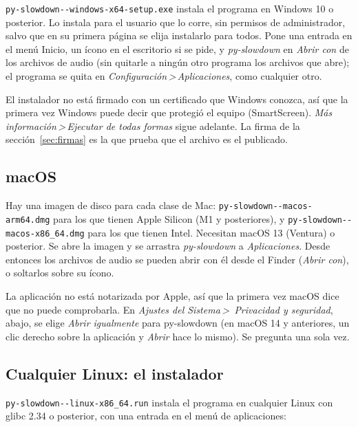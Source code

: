 \documentclass[12pt,
              article,
              oneside
              ]{memoir}
\newcommand*{\menu}[1]{\textit{#1}}
\newcommand*{\then}{\,>\,}
\begin{document}
%
\texttt{py-slowdown-\version-windows-x64-setup.exe} instala el programa en
Windows 10 o posterior. Lo instala para el usuario que lo corre, sin
permisos de administrador, salvo que en su primera página se elija
instalarlo para todos. Pone una entrada en el menú Inicio, un ícono en el
escritorio si se pide, y \menu{py-slowdown} en \menu{Abrir con} de los
archivos de audio (sin quitarle a ningún otro programa los archivos que
abre); el programa se quita en \menu{Configuración\then Aplicaciones}, como
cualquier otro.

%
El instalador no está firmado con un certificado que Windows conozca, así
que la primera vez Windows puede decir que protegió el equipo
(SmartScreen). \menu{Más información\then Ejecutar de todas formas} sigue
adelante. La firma de la sección~\ref{sec:firmas} es la que prueba que el
archivo es el publicado.

\subsection{macOS}

%
Hay una imagen de disco para cada clase de Mac:
\texttt{py-slowdown-\version-macos-arm64.dmg} para los que tienen Apple
Silicon (M1 y posteriores), y \texttt{py-slowdown-\version-macos-x86\_64.dmg}
para los que tienen Intel. Necesitan macOS 13 (Ventura) o posterior. Se
abre la imagen y se arrastra \menu{py-slowdown} a \menu{Aplicaciones}.
Desde entonces los archivos de audio se pueden abrir con él desde el Finder
(\menu{Abrir con}), o soltarlos sobre su ícono.

%
La aplicación no está notarizada por Apple, así que la primera vez macOS
dice que no puede comprobarla. En \menu{Ajustes del Sistema\then
Privacidad y seguridad}, abajo, se elige \menu{Abrir igualmente} para
py-slowdown (en macOS 14 y anteriores, un clic derecho sobre la aplicación
y \menu{Abrir} hace lo mismo). Se pregunta una sola vez.

\subsection{Cualquier Linux: el instalador}

%
\texttt{py-slowdown-\version-linux-x86\_64.run} instala el programa en
cualquier Linux con glibc 2.34 o posterior, con una entrada en el menú de
aplicaciones:
\end{document}
